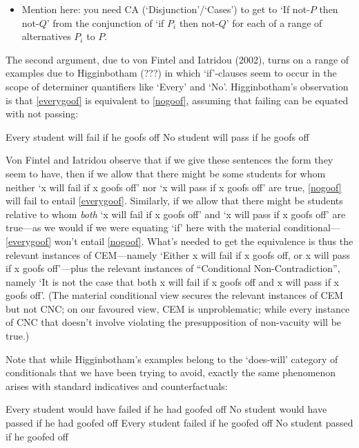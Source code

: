 \documentclass[If.tex]{subfiles}
\begin{document}
\begin{itemize}
	\item
	Mention here: you need CA (‘Disjunction’/‘Cases’) to get to ‘If not-$P$ then not-$Q$’ from the conjunction of ‘if $P_i$ then not-$Q$’ for each of a range of alternatives $P_i$ to $P$. 
\end{itemize}


The second argument, due to von Fintel and Iatridou (2002), turns on a range of examples due to Higginbotham (???) in which ‘if’-clauses seem to occur in the scope of determiner quantifiers like ‘Every’ and ‘No’. Higginbotham's observation is that \ref{everygoof} is equivalent to \ref{nogoof}, assuming that failing can be equated with not passing:
\begin{prop}
	\nitem \label{everygoof}
	Every student will fail if he goofs off
	\nitem \label{nogoof}
	No student will pass if he goofs off
\end{prop}
Von Fintel and Iatridou observe that if we give these sentences the form they seem to have, then if we allow that there might be some students for whom neither ‘x will fail if x goofs off’ nor ‘x will pass if x goofs off’ are true, \ref{nogoof} will fail to entail \ref{everygoof}. Similarly, if we allow that there might be students relative to whom \emph{both} ‘x will fail if x goofs off’ and ‘x will pass if x goofs off’ are true---as we would if we were equating ‘if’ here with the material conditional---\ref{everygoof} won't entail \ref{nogoof}. What's needed to get the equivalence is thus the relevant instances of CEM---namely ‘Either x will fail if x goofs off, or x will pass if x goofs off’---plus the relevant instances of “Conditional Non-Contradiction”, namely ‘It is not the case that both x will fail if x goofs off and x will pass if x goofs off’. (The material conditional view secures the relevant instances of CEM but not CNC; on our favoured view, CEM is unproblematic; while every instance of CNC that doesn't involve violating the presupposition of non-vacuity will be true.)

Note that while Higginbotham's examples belong to the ‘does-will’ category of conditionals that we have been trying to avoid, exactly the same phenomenon arises with standard indicatives and counterfactuals:
\begin{prop}
	\nitem
	Every student would have failed if he had goofed off
	\nitem
	No student would have passed if he had goofed off
	\nitem \label{everygoofpast}
	Every student failed if he goofed off
	\nitem \label{nogoofpast}
	No student passed if he goofed off
\end{prop}
\end{document}

